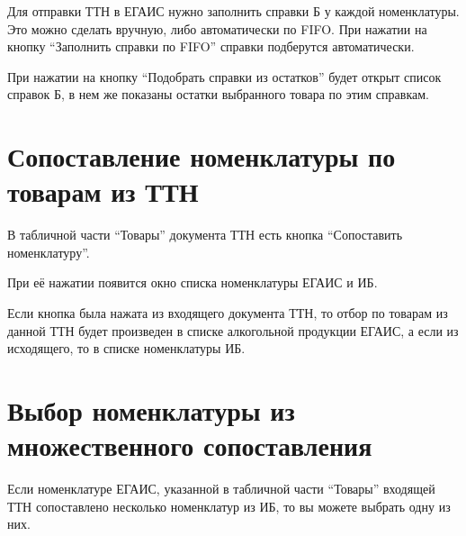 \documentclass[letterpaper,10pt,russian]{sphinxmanual}
\begin{document}
Для отправки ТТН в ЕГАИС нужно заполнить справки Б у каждой номенклатуры. Это можно сделать вручную, либо автоматически по FIFO.
При нажатии на кнопку ``Заполнить справки по FIFO'' справки подберутся автоматически.
\begin{figure}[htbp]
\centering

\noindent{}
\end{figure}
\begin{figure}[htbp]
\centering

\noindent{}
\end{figure}

При нажатии на кнопку ``Подобрать справки из остатков'' будет открыт список справок Б, в нем же показаны остатки выбранного товара по этим справкам.
\begin{figure}[htbp]
\centering

\noindent{}
\end{figure}
\begin{figure}[htbp]
\centering

\noindent{}
\end{figure}


\section{Сопоставление номенклатуры по товарам из ТТН}
\label{ttn:id3}
В табличной части ``Товары'' документа ТТН есть кнопка ``Сопоставить номенклатуру''.
\begin{figure}[htbp]
\centering

\noindent{}
\end{figure}

При её нажатии появится окно списка номенклатуры ЕГАИС и ИБ.
\begin{figure}[htbp]
\centering

\noindent{}
\end{figure}

Если кнопка была нажата из входящего документа ТТН, то отбор по товарам из данной ТТН будет произведен в списке алкогольной продукции ЕГАИС, а если из исходящего, то в списке номенклатуры ИБ.


\section{Выбор номенклатуры из множественного сопоставления}
\label{ttn:id4}
Если номенклатуре ЕГАИС, указанной в табличной части ``Товары'' входящей ТТН сопоставлено несколько номенклатур из ИБ, то вы можете выбрать одну из них.
\begin{figure}[htbp]
\centering

\noindent{}
\end{figure}
\end{document}

